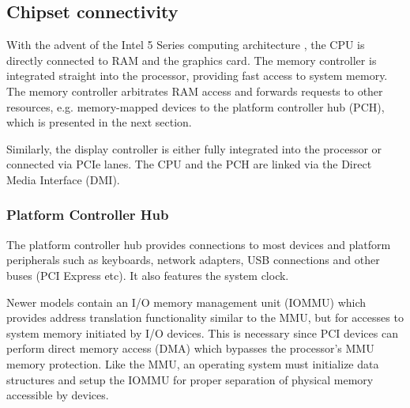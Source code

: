 \subsection{Chipset connectivity}
With the advent of the Intel 5 Series computing architecture
\cite{wiki:intel:5:series}, the CPU is directly connected to RAM and the
graphics card. The memory controller is integrated straight into the processor,
providing fast access to system memory. The memory controller arbitrates RAM
access and forwards requests to other resources, e.g. memory-mapped devices to
the platform controller hub (PCH), which is presented in the next section.

Similarly, the display controller is either fully integrated into the processor
or connected via PCIe lanes. The CPU and the PCH are linked via the Direct Media
Interface (DMI).

\subsubsection{Platform Controller Hub}
The platform controller hub provides connections to most devices and
platform peripherals such as keyboards, network adapters, USB connections and
other buses (PCI Express etc). It also features the system clock.

Newer models contain an I/O memory management unit (IOMMU) which
provides address translation functionality similar to the MMU, but for accesses
to system memory initiated by I/O devices.  This is necessary since PCI devices
can perform direct memory access (DMA) which bypasses the processor's
MMU memory protection. Like the MMU, an operating system must initialize data
structures and setup the IOMMU for proper separation of physical memory
accessible by devices.
